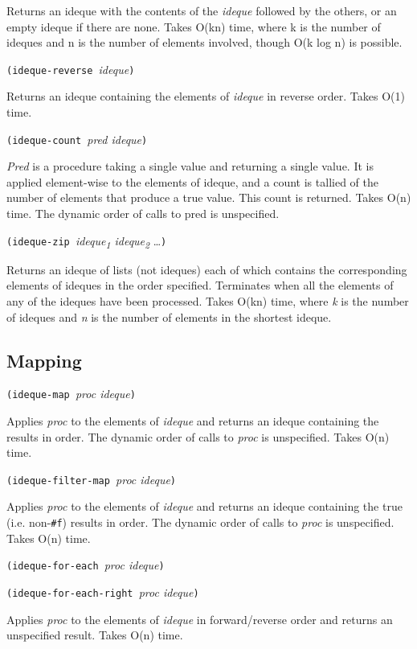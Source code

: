 Returns an ideque with the contents of the \emph{ideque} followed by the
others, or an empty ideque if there are none. Takes O(kn) time, where k
is the number of ideques and n is the number of elements involved,
though O(k log n) is possible.

\texttt{(ideque-reverse\ }\emph{ideque}\texttt{)}

Returns an ideque containing the elements of \emph{ideque} in reverse
order. Takes O(1) time.

\texttt{(ideque-count\ }\emph{pred ideque}\texttt{)}

\emph{Pred} is a procedure taking a single value and returning a single
value. It is applied element-wise to the elements of ideque, and a count
is tallied of the number of elements that produce a true value. This
count is returned. Takes O(n) time. The dynamic order of calls to pred
is unspecified.

\texttt{(ideque-zip\ }\emph{ideque\textsubscript{1}
ideque\textsubscript{2}} \ldots{}\texttt{)}

Returns an ideque of lists (not ideques) each of which contains the
corresponding elements of ideques in the order specified. Terminates
when all the elements of any of the ideques have been processed. Takes
O(kn) time, where \emph{k} is the number of ideques and \emph{n} is the
number of elements in the shortest ideque.

\hypertarget{Mapping}{\subsection{Mapping}\label{Mapping}}

\texttt{(ideque-map\ }\emph{proc ideque}\texttt{)}

Applies \emph{proc} to the elements of \emph{ideque} and returns an
ideque containing the results in order. The dynamic order of calls to
\emph{proc} is unspecified. Takes O(n) time.

\texttt{(ideque-filter-map\ }\emph{proc ideque}\texttt{)}

Applies \emph{proc} to the elements of \emph{ideque} and returns an
ideque containing the true (i.e. non-\texttt{\#f}) results in order. The
dynamic order of calls to \emph{proc} is unspecified. Takes O(n) time.

\texttt{(ideque-for-each\ }\emph{proc ideque}\texttt{)}

\texttt{(ideque-for-each-right\ }\emph{proc ideque}\texttt{)}

Applies \emph{proc} to the elements of \emph{ideque} in forward/reverse
order and returns an unspecified result. Takes O(n) time.

